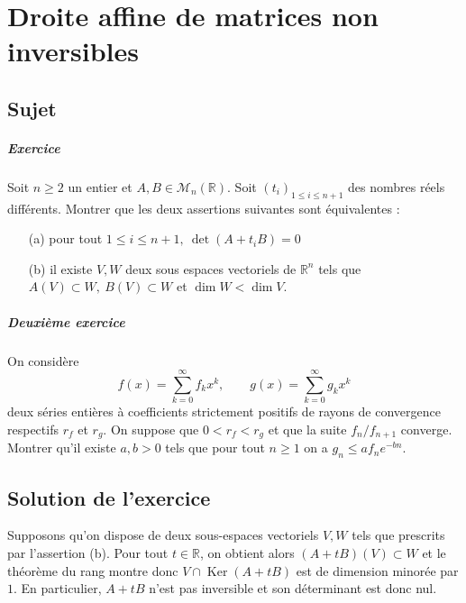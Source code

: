 \chapter{Droite affine de matrices non inversibles}

\section{Sujet}

\paragraph{Exercice}
Soit $n \geqslant 2$ un entier et $A,B \in \mathscr M_n(\mathbb R)$. Soit $(t_i)_{1\leqslant i \leqslant n+1}$ des nombres réels différents. Montrer que les deux assertions suivantes sont équivalentes :
\begin{enumerate}
    \item[(a)] pour tout $1 \leqslant i \leqslant n+1,\ \det(A+t_iB) = 0$
    \item[(b)] il existe $V,W$ deux sous espaces vectoriels de $\mathbb R^n$ tels que $A(V) \subset W,\ B(V) \subset W$ et $\dim W < \dim V$.
\end{enumerate}

\paragraph{Deuxième exercice}
On considère
$$
f(x) = \sum_{k=0}^{\infty} f_k x^k,
\qquad
g(x) = \sum_{k=0}^{\infty} g_k x^k
$$
deux séries entières à coefficients strictement positifs de rayons de convergence respectifs $r_f$ et $r_g$.
On suppose que $0 < r_f < r_g$ et que la suite $f_n/f_{n+1}$ converge.
Montrer qu'il existe $a,b > 0$ tels que pour tout $n \geqslant 1$ on a $g_n \leqslant a f_n e^{-bn}$.

\section{Solution de l'exercice}


Supposons qu'on dispose de deux sous-espaces vectoriels $V,W$ tels que prescrits par l'assertion (b). Pour tout $t \in \mathbb R$, on obtient alors $(A+tB)(V) \subset W$ et le théorème du rang montre donc $V \cap \operatorname{Ker}(A+tB)$ est de dimension minorée par $1$. En particulier, $A+tB$ n'est pas inversible et son déterminant est donc nul.

